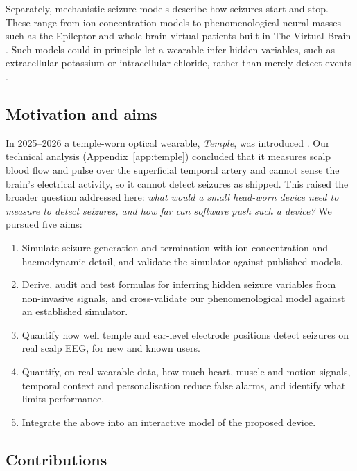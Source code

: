 Separately, mechanistic seizure models describe how seizures start and stop. These range from ion-concentration models \cite{cressman2009,ullah2009,krishnan2011,wei2014} to phenomenological neural masses such as the Epileptor \cite{jirsa2014} and whole-brain virtual patients built in The Virtual Brain \cite{sanzleon2013,jirsa2017,hashemi2020}. Such models could in principle let a wearable infer hidden variables, such as extracellular potassium or intracellular chloride, rather than merely detect events \cite{ullah2010}.

\subsection{Motivation and aims}

In 2025--2026 a temple-worn optical wearable, \emph{Temple}, was introduced \cite{temple}. Our technical analysis (Appendix~\ref{app:temple}) concluded that it measures scalp blood flow and pulse over the superficial temporal artery and cannot sense the brain's electrical activity, so it cannot detect seizures as shipped. This raised the broader question addressed here: \emph{what would a small head-worn device need to measure to detect seizures, and how far can software push such a device?} We pursued five aims:
\begin{enumerate}[label=\textbf{A\arabic*.}]
\item Simulate seizure generation and termination with ion-concentration and haemodynamic detail, and validate the simulator against published models.
\item Derive, audit and test formulas for inferring hidden seizure variables from non-invasive signals, and cross-validate our phenomenological model against an established simulator.
\item Quantify how well temple and ear-level electrode positions detect seizures on real scalp EEG, for new and known users.
\item Quantify, on real wearable data, how much heart, muscle and motion signals, temporal context and personalisation reduce false alarms, and identify what limits performance.
\item Integrate the above into an interactive model of the proposed device.
\end{enumerate}

\subsection{Contributions}

